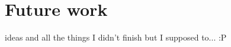 %
%



\chapter{Future work}
\label{cha:future}

ideas and all the things I didn't finish but I supposed to... :P
